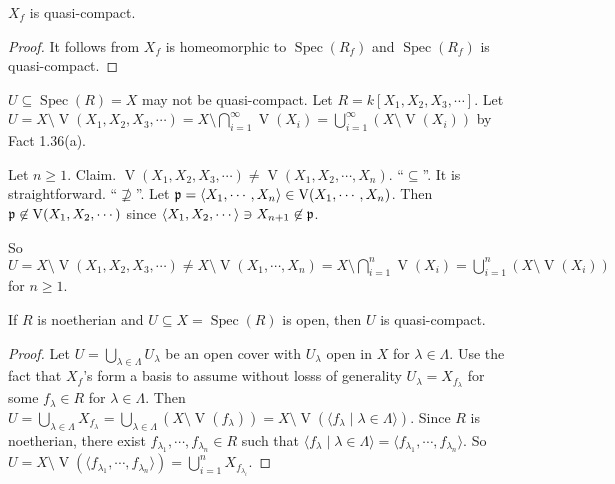 \begin{corollary}
    $X_f$ is quasi-compact.
\end{corollary}

\begin{proof}
    It follows from $X_f$ is homeomorphic to $\operatorname{Spec}(R_f)$ and $\operatorname{Spec}(R_f)$ is quasi-compact.
\end{proof}

\begin{example*}
    $U \subseteq \operatorname{Spec}(R) = X$ may not be quasi-compact. Let $R = k[X_1,X_2,X_3,\cdots]$. Let $U = X \setminus \operatorname{V}(X_1,X_2,X_3,\cdots) = X \setminus \bigcap_{i=1}^{\infty} \operatorname{V}(X_i) = \bigcup_{i=1}^\infty (X \setminus \operatorname{V}(X_i))$ by Fact 1.36(a). \par 
    Let $n \geq 1$. Claim. $\operatorname{V}(X_1,X_2,X_3,\cdots) \neq \operatorname{V}(X_1,X_2,\cdots,X_n)$. ``$\subseteq$''. It is straightforward. ``$\not \supseteq$''. Let $\mathfrak{p} = \langle X_1,\cdots,X_n \rangle \in \operatorname{V}(X_1,\cdots,X_n)$. Then $\mathfrak{p} \not \in \operatorname{V}(X_1,X_2,\cdots)$ since $\langle X_1,X_2,\cdots \rangle\ni X_{n+1} \not \in \mathfrak{p}$. \par 
    So $U = X \setminus \operatorname{V}(X_1,X_2,X_3,\cdots) \neq X \setminus \operatorname{V}(X_1,\cdots,X_n) = X \setminus \bigcap_{i=1}^{n} \operatorname{V}(X_i) = \bigcup_{i=1}^n (X \setminus \operatorname{V}(X_i))$ for $n \geq 1$. 
\end{example*}

\begin{fact*}
    If $R$ is noetherian and $U \subseteq X = \operatorname{Spec}(R)$ is open, then $U$ is quasi-compact. 
\end{fact*}

\begin{proof}
    Let $U = \bigcup_{\lambda \in \Lambda}U_\lambda$ be an open cover with $U_\lambda$ open in $X$ for $\lambda \in \Lambda$. Use the fact that $X_f$'s form a basis to assume without losss of generality $U_\lambda = X_{f_\lambda}$ for some $f_\lambda \in R$ for $\lambda \in \Lambda$. Then $U = \bigcup_{\lambda \in \Lambda} X_{f_\lambda} = \bigcup_{\lambda \in \Lambda} (X \setminus \operatorname{V}(f_\lambda)) = X \setminus \operatorname{V}(\langle f_\lambda \mid \lambda \in \Lambda \rangle)$. Since $R$ is noetherian, there exist $f_{\lambda_1},\cdots,f_{\lambda_n} \in R$ such that $\langle f_\lambda \mid \lambda \in \Lambda \rangle = \langle f_{\lambda_1},\cdots,f_{\lambda_n} \rangle$. So $U = X \setminus \operatorname{V}(\langle f_{\lambda_1},\cdots,f_{\lambda_n} \rangle) = \bigcup_{i=1}^n X_{f_{\lambda_i}}$. 
\end{proof}

